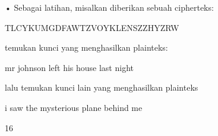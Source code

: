 \documentclass{article}
\begin{document}

• Sebagai latihan, misalkan diberikan sebuah cipherteks:


TLCYKUMGDFAWTZVOYKLENSZZHYZRW


    temukan kunci yang menghasilkan plainteks:

       mr johnson left his house last night

     lalu temukan kunci lain yang menghasilkan  plainteks 


i saw the mysterious plane behind me

16
\end{document}
